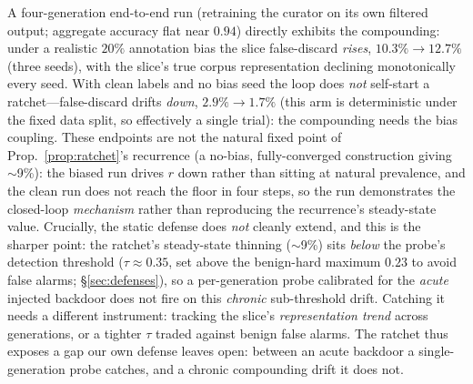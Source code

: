 \documentclass[conference]{IEEEtran}
\begin{document}
A four-generation end-to-end run (retraining the curator on its own filtered output; aggregate accuracy flat
near $0.94$) directly exhibits the compounding: under a realistic $20\%$ annotation bias the slice false-discard
\emph{rises}, $10.3\%\!\to\!12.7\%$ (three seeds), with the slice's true corpus representation declining
monotonically every seed. With clean labels and no bias seed the loop does
\emph{not} self-start a ratchet---false-discard drifts \emph{down}, $2.9\%\!\to\!1.7\%$ (this arm is
deterministic under the fixed data split, so effectively a single trial): the compounding needs the bias
coupling. These endpoints are not the natural fixed point of Prop.~\ref{prop:ratchet}'s recurrence (a no-bias,
fully-converged construction giving $\sim$9\%): the biased run drives $r$ down rather than sitting at natural
prevalence, and the clean run does not reach the floor in four steps, so the run demonstrates the closed-loop
\emph{mechanism} rather than reproducing the recurrence's steady-state value.
Crucially, the static defense does \emph{not} cleanly extend, and this is the sharper point: the ratchet's
steady-state thinning ($\sim$9\%) sits \emph{below} the probe's detection threshold ($\tau\!\approx\!0.35$, set
above the benign-hard maximum $0.23$ to avoid false alarms; \S\ref{sec:defenses}), so a per-generation probe
calibrated for the \emph{acute} injected backdoor does not fire on this \emph{chronic} sub-threshold drift.
Catching it needs a different instrument: tracking the slice's \emph{representation trend} across generations,
or a tighter $\tau$ traded against benign false alarms. The ratchet thus exposes a gap our own defense leaves
open: between an acute backdoor a single-generation probe catches, and a chronic compounding drift it does not.
\end{document}
